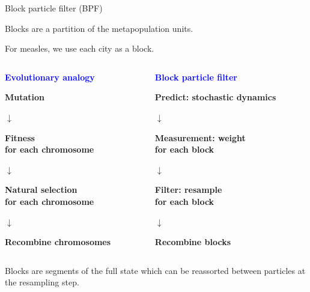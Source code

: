 \documentclass{beamer}
\begin{document}
\begin{frame}{Block particle filter (BPF)}

  \begin{myitemize}
    \item Blocks are a partition of the metapopulation units.
    \item For measles, we use each city as a block.
  \end{myitemize}
  
  \begin{columns}
    \begin{column}{0.48\linewidth}
      \begin{center}
      {\bf \textcolor{blue}{Evolutionary analogy}}

      \vspace{5mm}
      
      {\bf Mutation}

      $\downarrow$

      {\bf Fitness\\
      for each chromosome}

      $\downarrow$

      {\bf Natural selection\\
      for each chromosome}

      $\downarrow$

      {\bf Recombine chromosomes}
      
      \end{center}
    \end{column}
     \begin{column}{0.48\linewidth}
      \begin{center}
      {\bf \textcolor{blue}{Block particle filter}}

      \vspace{5mm}
      
      {\bf Predict: stochastic dynamics}

      $\downarrow$

      {\bf Measurement: weight\\
      for each block}

      $\downarrow$

      {\bf Filter: resample\\
      for each block}

      $\downarrow$

      {\bf Recombine blocks}
      \end{center}
    \end{column}
  \end{columns}

  \vspace{5mm}
  
    \begin{myitemize}
    \item Blocks are segments of the full state which can be reassorted between particles at the resampling step.

\end{myitemize}

\end{frame}
\end{document}
